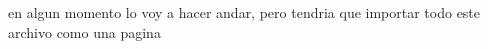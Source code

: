 en algun momento lo voy a hacer andar, pero tendria que importar todo este archivo como una pagina 
\begin{DoxyVerbInclude}
\end{DoxyVerbInclude}
 